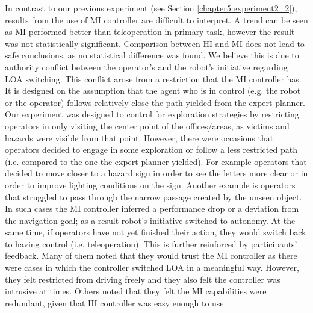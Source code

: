 \documentclass[a4paper,12pt,oneside,openright]{bhamthesis}
\begin{document}
In contrast to our previous experiment (see Section \ref{chapter5:experiment2_2}), results from the use of MI controller are difficult to interpret. A trend can be seen as MI performed better than teleoperation in primary task, however the result was not statistically significant. Comparison between HI and MI does not lead to safe conclusions, as no statistical difference was found. We believe this is due to authority conflict between the operator's and the robot's initiative regarding LOA switching. This conflict arose from a restriction that the MI controller has. It is designed on the assumption that the agent who is in control (e.g. the robot or the operator) follows relatively close the path yielded from the expert planner. Our experiment was designed to control for exploration strategies by restricting operators in only visiting the center point of the offices/areas, as victims and hazards were visible from that point. However, there were occasions that operators decided to engage in some exploration or follow a less restricted path (i.e. compared to the one the expert planner yielded). For example operators that decided to move closer to a hazard sign in order to see the letters more clear or in order to improve lighting conditions on the sign. Another example is operators that struggled to pass through the narrow passage created by the unseen object. In such cases the MI controller inferred a performance drop or a deviation from the navigation goal; as a result robot's initiative switched to autonomy. At the same time, if operators have not yet finished their action, they would switch back to having control (i.e. teleoperation). This is further reinforced by participants' feedback. Many of them noted that they would trust the MI controller as there were cases in which the controller switched LOA in a meaningful way. However, they felt restricted from driving freely and they also felt the controller was intrusive at times. Others noted that they felt the MI capabilities were redundant, given that HI controller was easy enough to use.
\end{document}
